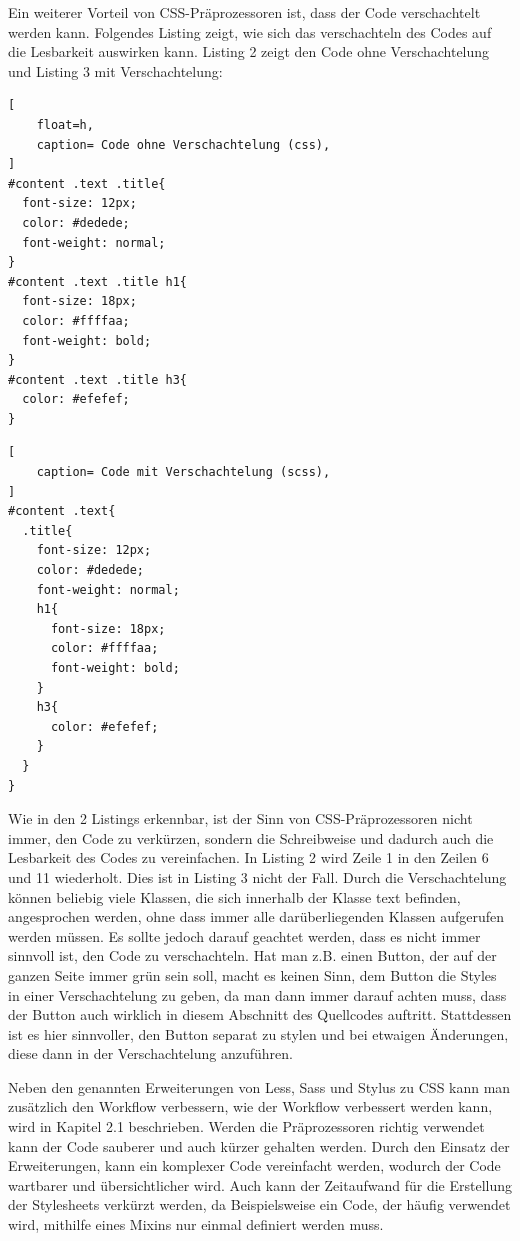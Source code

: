 Ein weiterer Vorteil von CSS-Präprozessoren ist, dass der Code verschachtelt werden kann. Folgendes Listing zeigt, wie sich das verschachteln des Codes auf die Lesbarkeit auswirken kann. Listing 2 zeigt den Code ohne Verschachtelung und Listing 3 mit Verschachtelung:\newline
\begin{lstlisting}[
	float=h,
	caption= Code ohne Verschachtelung (css),
]
#content .text .title{
  font-size: 12px;
  color: #dedede;
  font-weight: normal;
}
#content .text .title h1{
  font-size: 18px;
  color: #ffffaa;
  font-weight: bold;
}
#content .text .title h3{
  color: #efefef;
}
\end{lstlisting}

\begin{lstlisting}[
	caption= Code mit Verschachtelung (scss),
]
#content .text{
  .title{
    font-size: 12px;
    color: #dedede;
    font-weight: normal;
    h1{
      font-size: 18px;
      color: #ffffaa;
      font-weight: bold;
    }
    h3{
      color: #efefef;
    }
  }
}
\end{lstlisting}

Wie in den 2 Listings erkennbar, ist der Sinn von CSS-Präprozessoren nicht immer, den Code zu verkürzen, sondern die Schreibweise und dadurch auch die Lesbarkeit des Codes zu vereinfachen. In Listing 2 wird Zeile 1 in den Zeilen 6 und 11 wiederholt. Dies ist in Listing 3 nicht der Fall. Durch die Verschachtelung können beliebig viele Klassen, die sich innerhalb der Klasse text befinden, angesprochen werden, ohne dass immer alle darüberliegenden Klassen aufgerufen werden müssen. \newline
Es sollte jedoch darauf geachtet werden, dass es nicht immer sinnvoll ist, den Code zu verschachteln. Hat man z.B. einen Button, der auf der ganzen Seite immer grün sein soll, macht es keinen Sinn, dem Button die Styles in einer Verschachtelung zu geben, da man dann immer darauf achten muss, dass der Button auch wirklich in diesem Abschnitt des Quellcodes auftritt. Stattdessen ist es hier sinnvoller, den Button separat zu stylen und bei etwaigen Änderungen, diese dann in der Verschachtelung anzuführen.

Neben den genannten Erweiterungen von Less, Sass und Stylus zu CSS kann man zusätzlich den Workflow verbessern, wie der Workflow verbessert werden kann, wird in Kapitel 2.1 beschrieben. Werden die Präprozessoren richtig verwendet kann der Code sauberer und auch kürzer gehalten werden.\newline
Durch den Einsatz der Erweiterungen, kann ein komplexer Code vereinfacht werden, wodurch der Code wartbarer und übersichtlicher wird. Auch kann der Zeitaufwand für die Erstellung der Stylesheets verkürzt werden, da Beispielsweise ein Code, der häufig verwendet wird, mithilfe eines Mixins nur einmal definiert werden muss.

